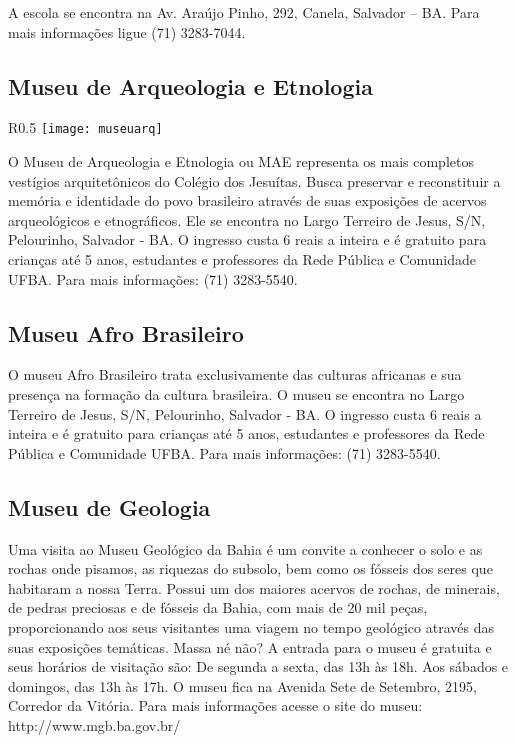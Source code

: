 A escola se encontra na Av. Araújo Pinho, 292, Canela, Salvador – BA. Para mais informações ligue (71) 3283-7044.

\subsection {Museu de Arqueologia e Etnologia}
\begin{wrapfigure}{R}{0.5\textwidth}
	\texttt{[image: museuarq]}
\end{wrapfigure}  

O Museu de Arqueologia e Etnologia ou MAE representa os mais completos vestígios arquitetônicos do Colégio dos Jesuítas. Busca preservar e reconstituir a memória e identidade do povo brasileiro através de suas exposições de acervos arqueológicos e etnográficos. Ele se encontra no Largo Terreiro de Jesus, S/N, Pelourinho, Salvador - BA. O ingresso custa 6 reais a inteira e é gratuito para crianças até 5 anos, estudantes e professores da Rede Pública e Comunidade UFBA. Para mais informações: (71) 3283-5540.
                    
\subsection {Museu Afro Brasileiro}  

O museu Afro Brasileiro trata exclusivamente das culturas africanas e sua presença na formação da cultura brasileira. O museu se encontra no Largo Terreiro de Jesus, S/N, Pelourinho, Salvador - BA. O ingresso custa 6 reais a inteira e é gratuito para crianças até 5 anos, estudantes e professores da Rede Pública e Comunidade UFBA. Para mais informações: (71) 3283-5540.
                    
\subsection {Museu de Geologia} 
                    
Uma visita ao Museu Geológico da Bahia é um convite a conhecer o solo e as rochas onde pisamos, as riquezas do subsolo, bem como os fósseis dos seres que habitaram a nossa Terra. Possui um dos maiores acervos de rochas, de minerais, de pedras preciosas e de fósseis da Bahia, com mais de 20 mil peças, proporcionando aos seus visitantes uma viagem no tempo geológico através das suas exposições temáticas. Massa né não?
                	A entrada para o museu é gratuita e seus horários de visitação são:
	                De segunda a sexta, das 13h às 18h.
	                Aos sábados e domingos, das 13h às 17h.
	                O museu fica na Avenida Sete de Setembro, 2195, Corredor da Vitória.
                    Para mais informações acesse o site do museu: http://www.mgb.ba.gov.br/
	                
